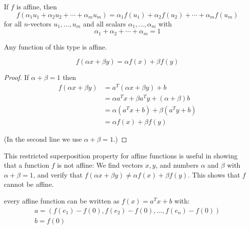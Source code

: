 \begin{corollary}
    If $ f $ is affine, then
\begin{equation}
f\left(\alpha_{1} u_{1}+\alpha_{2} u_{2}+\cdots+\alpha_{m} u_{m}\right)=\alpha_{1} f\left(u_{1}\right)+\alpha_{2} f\left(u_{2}\right)+\cdots+\alpha_{m} f\left(u_{m}\right)
\end{equation}
for all $ n $-vectors $ u_{1}, \ldots, u_{m} $ and all scalars $ \alpha_{1}, \ldots, \alpha_{m} $ with
\begin{equation}
\alpha_{1}+\alpha_{2}+\cdots+\alpha_{m}=1
\end{equation}
\end{corollary}



\begin{theorem}
    Any function of this type is affine.
    
    \begin{equation} f(\alpha x+\beta y)=\alpha f(x)+\beta f(y) \end{equation}
\end{theorem}

\begin{proof}
    If $ \alpha+\beta=1 $ then
    \begin{equation} \begin{aligned} f(\alpha x+\beta y) &=a^{T}(\alpha x+\beta y)+b \\ &=\alpha a^{T} x+\beta a^{T} y+(\alpha+\beta) b \\ &=\alpha\left(a^{T} x+b\right)+\beta\left(a^{T} y+b\right) \\ &=\alpha f(x)+\beta f(y) \end{aligned} \end{equation}

    (In the second line we use $\alpha + \beta = 1$.)

\end{proof}

\begin{corollary}
    This restricted superposition property for affine functions is useful in showing that a function $ f $ is not affine: We find vectors $ x, y $, and numbers $ \alpha $ and $ \beta $ with $ \alpha+\beta=1 $, and verify that $ f(\alpha x+\beta y) \neq \alpha f(x)+\beta f(y) . $ This shows that $ f $ cannot be affine.
\end{corollary}

\begin{theorem}
    every affine function can be written as $ f(x)=a^{T} x+b $ with:
\begin{equation}
\begin{array}{l}
a=\left(f\left(e_{1}\right)-f(0), f\left(e_{2}\right)-f(0), \ldots, f\left(e_{n}\right)-f(0)\right) \\
b=f(0)
\end{array}
\end{equation}

\end{theorem}


